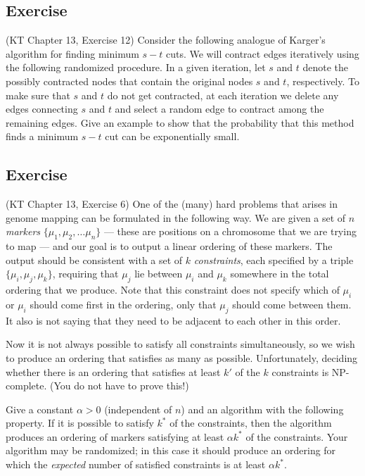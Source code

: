 \documentclass{article}
\newcounter{counter}
\newcommand{\Exercise}{Exercise \stepcounter{counter}\thecounter}
\begin{document}
\subsection*{\Exercise}
  (KT Chapter 13, Exercise 12)  Consider the following analogue of Karger's
  algorithm for finding minimum $s-t$ cuts.  We will contract edges
  iteratively using the following randomized procedure.  In a given iteration, let $s$ and $t$ denote the possibly contracted nodes that contain the original nodes $s$ and $t$, respectively.  To make sure that $s$ and $t$ do not get contracted, at each iteration we delete any edges connecting $s$ and $t$ and select a random edge to contract among the remaining edges.  Give an example to show that the probability that this method finds a minimum $s-t$ cut can be exponentially small.


\subsection*{\Exercise}
  (KT Chapter 13, Exercise 6)  One of the (many) hard problems that arises in genome mapping can be formulated in the following way.  We are given a set of $n$ {\it markers} $\{\mu_1, \mu_2, \dots \mu_n\}$ --- these are positions on a chromosome that we are trying to map --- and our goal is to output a linear ordering of these markers.  The output should be consistent with a set of $k$ {\it constraints}, each specified by a triple $\{\mu_i, \mu_j, \mu_k\}$, requiring that $\mu_j$ lie between $\mu_i$ and $\mu_k$ somewhere
  in the total ordering that we produce. Note that this constraint does not specify which of $\mu_i$ or $\mu_i$ should come first in the ordering, only that $\mu_j$ should come between them. It also is not saying that they need to be adjacent to each other in this order.

  \vspace{3mm}
  Now it is not always possible to satisfy all constraints simultaneously, so we wish to produce an ordering that satisfies as many as possible. Unfortunately, deciding whether there is an ordering that satisfies at least $k'$ of the $k$ constraints is NP-complete.  (You do not have to prove this!)

    \vspace{3mm}
  Give a constant $\alpha > 0$ (independent of $n$) and an algorithm with the following property.  If it is possible to satisfy $k^*$ of the constraints, then the algorithm produces an ordering of markers satisfying at least $\alpha k^*$ of the constraints.  Your algorithm may be randomized; in this case it should produce an ordering for which the {\it expected} number of satisfied constraints is at least $\alpha k^*$. 
\end{document}
